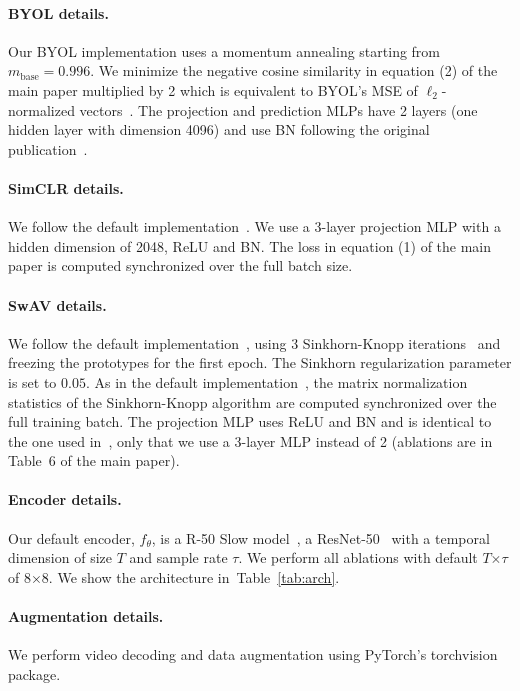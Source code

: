 \documentclass[final]{cvpr}
\newcommand{\tblref}[1]{Table~\ref{#1}}
\def\x{$\times$}
\begin{document}
\paragraph{BYOL details.} Our BYOL implementation uses a momentum annealing starting from $m_\text{base} = 0.996$. We minimize the negative cosine similarity in equation ({\color{red}2}) of the main paper multiplied by 2 which is equivalent to BYOL's MSE of $\ell_2$-normalized vectors~\cite{Grill2020}. The projection and prediction MLPs have 2 layers (one hidden layer with dimension 4096) and use BN following the original publication~\cite{Grill2020}.

\paragraph{SimCLR details.} We follow the default implementation~\cite{Chen20}. We use a 3-layer projection MLP with  a hidden dimension of 2048, ReLU and BN. The loss in equation ({\color{red}1}) of the main paper is computed synchronized over the full batch size.

\paragraph{SwAV details.} We follow the default implementation~\cite{Caron20}, using 3 Sinkhorn-Knopp iterations~\cite{cuturi2013sinkhorn} and freezing the prototypes for the first epoch. 
The Sinkhorn regularization parameter is set to $0.05$. As in the default implementation~\cite{Caron20}, the matrix normalization statistics of the Sinkhorn-Knopp algorithm are computed synchronized over the full training batch. 
The projection MLP uses ReLU and BN and is identical to the one used in~\cite{Caron20}, only that we use a 3-layer MLP instead of 2 (ablations are in Table~{\color{red}6} of the main paper).

\paragraph{Encoder details.} Our default encoder,  $f_\theta$, is a R-50 Slow model~\cite{Feichtenhofer19}, \ie a ResNet-50~\cite{He16} with a temporal dimension of size $T$ and sample rate $\tau$. We perform all ablations with default $T$\x $\tau$ of 8\x 8. We show the architecture in~\tblref{tab:arch}. 

\paragraph{Augmentation details.}
We perform video decoding and data augmentation using PyTorch's torchvision package. 
\end{document}
